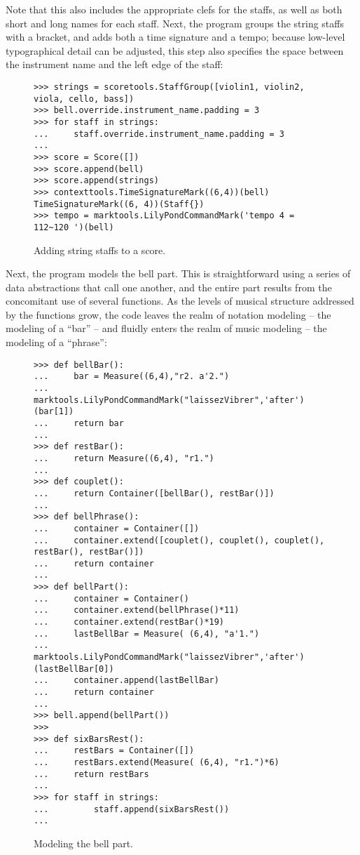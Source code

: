 Note that this also includes the appropriate clefs for the staffs, as well as both short and long names for each staff. Next, the program groups the string staffs with a bracket, and adds both a time signature and a tempo; because low-level typographical detail can be adjusted, this step also specifies the space between the instrument name and the left edge of the staff:

\begin{figure}[H] 
\begin{lstlisting}[basicstyle=\scriptsize\ttfamily, breaklines=True, tabsize=4, showtabs=false, showspaces=false]
>>> strings = scoretools.StaffGroup([violin1, violin2, viola, cello, bass])
>>> bell.override.instrument_name.padding = 3
>>> for staff in strings:
...     staff.override.instrument_name.padding = 3
... 
>>> score = Score([])
>>> score.append(bell)
>>> score.append(strings)
>>> contexttools.TimeSignatureMark((6,4))(bell)
TimeSignatureMark((6, 4))(Staff{})
>>> tempo = marktools.LilyPondCommandMark('tempo 4 = 112~120 ')(bell)\end{lstlisting}

\caption{Adding string staffs to a score. } 
\end{figure}

Next, the program models the bell part. This is straightforward using a series of data abstractions that call one another, and the entire part results from the concomitant use of several functions. As the levels of musical structure addressed by the functions grow, the code leaves the realm of notation modeling -- the modeling of a ``bar'' -- and fluidly enters the realm of music modeling -- the modeling of a ``phrase'':

\begin{figure}[H] 
\begin{lstlisting}[basicstyle=\scriptsize\ttfamily, breaklines=True, tabsize=4, showtabs=false, showspaces=false]
>>> def bellBar():
... 	bar = Measure((6,4),"r2. a'2.")
... 	marktools.LilyPondCommandMark("laissezVibrer",'after')(bar[1])
... 	return bar
... 
>>> def restBar():
... 	return Measure((6,4), "r1.")	
... 
>>> def couplet():
... 	return Container([bellBar(), restBar()])	
... 
>>> def bellPhrase():
... 	container = Container([])
... 	container.extend([couplet(), couplet(), couplet(), restBar(), restBar()])
... 	return container
... 
>>> def bellPart():
... 	container = Container()
... 	container.extend(bellPhrase()*11)
... 	container.extend(restBar()*19)
... 	lastBellBar = Measure( (6,4), "a'1.")
... 	marktools.LilyPondCommandMark("laissezVibrer",'after')(lastBellBar[0])
... 	container.append(lastBellBar)
... 	return container
... 
>>> bell.append(bellPart())
>>> 
>>> def sixBarsRest():
... 	restBars = Container([])
... 	restBars.extend(Measure( (6,4), "r1.")*6)
... 	return restBars
... 
>>> for staff in strings:
... 		staff.append(sixBarsRest())
... \end{lstlisting}

\caption{Modeling the bell part. } 
\end{figure}

